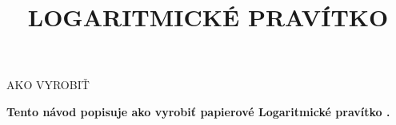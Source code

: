 
\usepackage{polyglossia}
\setdefaultlanguage{slovak}
\newcommand{\makefulltitle}{Ako vyrobiť Logaritmické pravítko }



\title{\fontsize{60}{60}\selectfont LOGARITMICKÉ PRAVÍTKO}
\preauthor{}\postauthor{}\author{}
\predate{}\postdate{}\date{}


  \begin{center}
    \headingfont\fontsize{32}{32}\selectfont AKO VYROBIŤ
  \end{center}

  {\let\newpage\relax\maketitle}%
  \nosection{}
  \large\textbf{\makeperex Tento návod popisuje ako vyrobiť papierové Logaritmické pravítko \modelname.}

